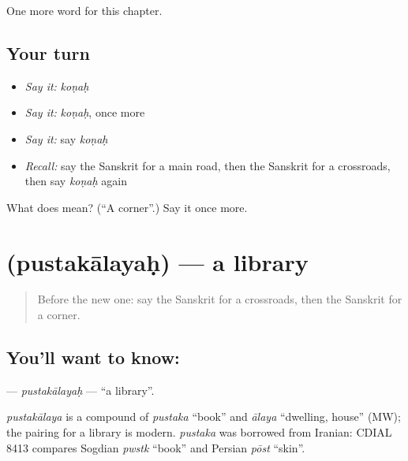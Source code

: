 \begin{grammarlens}[title={What you've built}]
One more word for this chapter.
\end{grammarlens}

\subsection*{Your turn}
\begin{itemize}
\raggedright
  \item \emph{Say it:} \emph{koṇaḥ}
  \item \emph{Say it:} \emph{koṇaḥ}, once more
  \item \emph{Say it:} say \emph{koṇaḥ}
  \item \emph{Recall:} say the Sanskrit for a main road, then the Sanskrit for a crossroads, then say \emph{koṇaḥ} again
\end{itemize}

\begin{tcolorbox}[breakable,colback=teal!4,colframe=teal!35!black,title={Before you move on}]
What does  mean? (\textquotedblleft{}A corner\textquotedblright{}.) Say it once more.
\end{tcolorbox}
\section[\texorpdfstring{\sk{पुस्तकालयः} (pustakālayaḥ)}{पुस्तकालयः (pustakālayaḥ)}]{ (pustakālayaḥ) — a library}

\label{lesson:SA-C96-pustakalayah}



\begin{quote}
Before the new one: say the Sanskrit for a crossroads, then the Sanskrit for a corner.
\end{quote}

\subsection*{You'll want to know: }
\textbf{} — \emph{pustakālayaḥ} — \textquotedblleft{}a library\textquotedblright{}.

\begin{cousinweb}
\emph{pustakālaya} is a compound of \emph{pustaka} \textquotedblleft{}book\textquotedblright{} and \emph{ālaya} \textquotedblleft{}dwelling, house\textquotedblright{} (MW); the pairing for a library is modern. \emph{pustaka} was borrowed from Iranian: CDIAL 8413 compares Sogdian \emph{pwstk} \textquotedblleft{}book\textquotedblright{} and Persian \emph{pōst} \textquotedblleft{}skin\textquotedblright{}.
\end{cousinweb}

